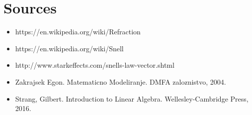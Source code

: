 \documentclass[A4]{article}
\begin{document}
\newpage

\section{Sources}
\begin{itemize}
  \item https://en.wikipedia.org/wiki/Refraction
  \item https://en.wikipedia.org/wiki/Snell%
  \item http://www.starkeffects.com/snells-law-vector.shtml
  \item Zakrajsek Egon. Matematicno Modeliranje. DMFA \- zaloznistvo, 2004.
  \item Strang, Gilbert. Introduction to Linear Algebra. Wellesley-Cambridge Press, 2016.
\end{itemize}
\end{document}
